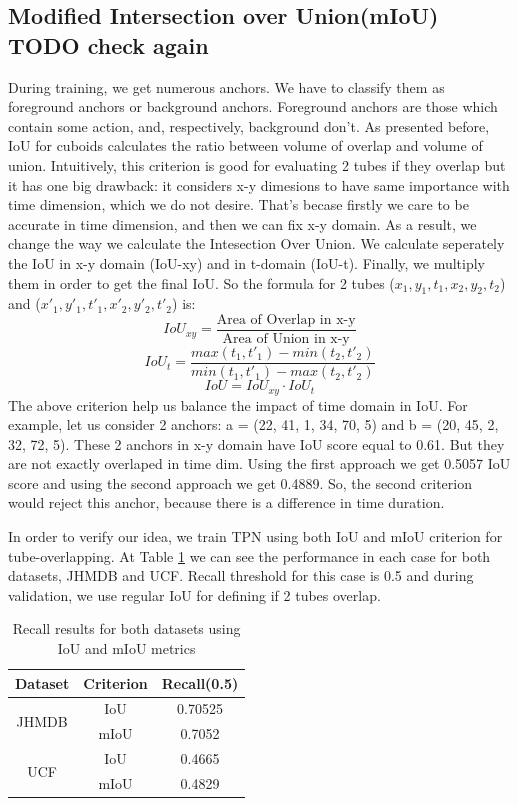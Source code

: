 \subsection{Modified Intersection over Union(mIoU) TODO check again} 
During training, we get numerous anchors. We have to classify them as foreground anchors or
background anchors. Foreground anchors are those which contain some action, and, respectively, background
don't. As presented before, IoU for cuboids calculates the ratio between volume of overlap and volume of
union.
Intuitively, this criterion is good for evaluating 2 tubes if they overlap but it has one big drawback:
it considers x-y dimesions to have same importance with time dimension, which we do not desire. That's becase
firstly we care to be accurate in time dimension, and then we can fix x-y domain.
As a result, we change the way we calculate the Intesection Over Union. We calculate seperately
the IoU in x-y domain (IoU-xy) and in t-domain (IoU-t). Finally, we multiply them in order to get the final IoU.
So the formula for 2 tubes ($x_1, y_1, t_1, x_2, y_2, t_2$) and ($x'_1, y'_1, t'_1, x'_2, y'_2, t'_2$) is:
\[ IoU_{xy} = \frac{ \text{Area of Overlap in x-y}} { \text{Area of Union in x-y}}  \]
\[ IoU_t = \frac { max(t_1, t'_1) - min(t_2, t'_2)} {min(t_1,t'_1) - max(t_2,t'_2)} \]
\[ IoU = IoU_{xy} \cdot  IoU_t \]
The above criterion help us balance the impact of time domain in IoU. For example, let us consider 2 anchors:
a = (22, 41, 1, 34, 70, 5) and b = (20, 45, 2, 32, 72, 5). These 2 anchors in x-y domain have IoU score equal to 0.61.
But they are not exactly overlaped in time dim. Using the first approach we get 0.5057 IoU score and using the
second approach we get 0.4889. So, the second criterion would reject this anchor, because there is a difference in time
duration.  \par

In order to verify our idea, we train TPN using both IoU and mIoU criterion for tube-overlapping. At Table \ref{table:iou_miou}
we can see the performance in each case for both datasets, JHMDB and UCF. Recall threshold for this case is 0.5 and during validation,
we use regular IoU for defining if 2 tubes overlap.
\begin{table}[h]
\centering
  \begin{tabular}{|| c | c || c ||}
    \hline
    \textbf{Dataset} & \textbf{Criterion} & \textbf{Recall(0.5)} \\
    \hline  \hline
    \multirow{2}{4em}{JHMDB} & IoU & 0.70525 \\
    \cline{2-3}
    {} & mIoU & 0.7052 \\
    \hline
    \multirow{2}{4em}{UCF} & IoU & 0.4665 \\
    \cline{2-3}
    {} & mIoU & 0.4829 \\
    \hline      
  \end{tabular}
  \caption{Recall results for both datasets using IoU and mIoU metrics}
  \label{table:iou_miou}
\end{table}

